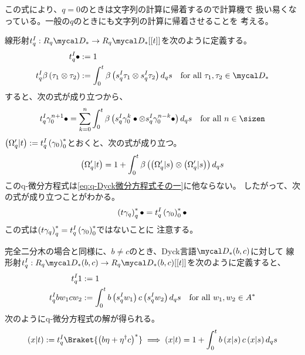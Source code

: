 {	この式により、$q=0$のときは文字列の計算に帰着するので計算機で
	扱い易くなっている。一般の$q$のときにも文字列の計算に帰着させることを
	考える。

	線形射$t_q^I:R_q\D_*\to R_q\D_*[[t]]$を次のように定義する。
	\begin{equation*}\begin{split}
		t_q^I\bullet &:= 1 \\
		t_q^I\beta\lr{\tau_1\otimes\tau_2} 
		&:= \int_0^t\beta\lr{s_q^I\tau_1\otimes s_q^I\tau_2}d_qs
		\quad\text{for all } \tau_1,\tau_2\in\D_*
	\end{split}\end{equation*}
	すると、次の式が成り立つから、
	\begin{equation*}\begin{split}
		t_q^I\gamma_0^{n+1}\bullet = \sum_{k=0}^n 
		\int_0^t\beta\lr{s_q^I\gamma_0^k\bullet
		\otimes s_q^I\gamma_0^{n-k}\bullet} d_qs 
		\quad\text{for all } n\in\sizen
	\end{split}\end{equation*}
	$\left({\Omega_q'|t}\right):=t_q^I\left({\gamma_0}\right)_0^*$とおくと、次の式が成り立つ。
	\begin{equation*}\begin{split}
		\left({\Omega_q'|t}\right)
		= 1 + \int_0^t\beta\left({\left({\Omega_q'|s}\right)\otimes\left({\Omega_q'|s}\right)}\right)d_qs
	\end{split}\end{equation*}
	このq-微分方程式は\eqref{eq:q-Dyck微分方程式その一}に他ならない。
	したがって、次の式が成り立つことがわかる。
	\begin{equation*}\begin{split}
		\left({t\gamma_q}\right)_q^*\bullet = t_q^I\left({\gamma_0}\right)_0^*\bullet
	\end{split}\end{equation*}
	この式は$\left({t\gamma_q}\right)_q^*=t_q^I\left({\gamma_0}\right)_0^*$ではないことに
	注意する。
	
	完全二分木の場合と同様に、$b\neq c$のとき、Dyck言語$\D_*(b,c)$に対して
	線形射$t_q^I:R_q\D_*(b,c)\to R_q\D_*(b,c)[[t]]$を次のように定義すると、
	\begin{equation*}\begin{split}
		t_q^I 1 &:= 1 \\
		t_q^I bw_1cw_2 &:= \int_0^t b\left({s_q^Iw_1}\right)c\left({s_q^Iw_2}\right)d_qs
		\quad\text{for all } w_1,w_2\in A^*
	\end{split}\end{equation*}
	次のようにq-微分方程式の解が得られる。
	\begin{equation*}\begin{split}
		\lr{x|t} := t_q^I\Braket{\lr{b\eta + \eta^\dag c}^*}
		\implies \lr{x|t} = 1 + \int_0^t b\lr{x|s}c\lr{x|s} d_qs
	\end{split}\end{equation*}

}
